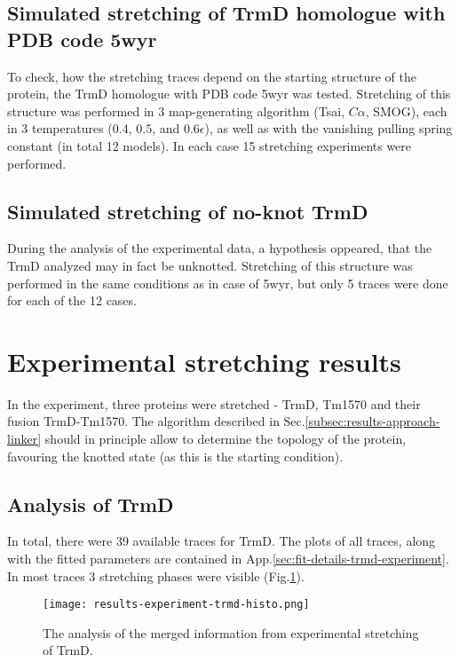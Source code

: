 \subsection{Simulated stretching of TrmD homologue with PDB code 5wyr}
\label{subsec:results-theory-5wyr}
To check, how the stretching traces depend on the starting structure of the protein, the TrmD homologue with PDB code 5wyr was tested.
Stretching of this structure was performed in 3 map-generating algorithm (Tsai, $C\alpha$, SMOG), each in 3 temperatures ($0.4$, $0.5$, and $0.6\epsilon$), as well as with the vanishing pulling spring constant (in total 12 models).
In each case 15 stretching experiments were performed.

\subsection{Simulated stretching of no-knot TrmD}
\label{subsec:results-theory-no-knot}
During the analysis of the experimental data, a hypothesis oppeared, that the TrmD analyzed may in fact be unknotted.
Stretching of this structure was performed in the same conditions as in case of 5wyr, but only 5 traces were done for each of the 12 cases.

\section{Experimental stretching results}
\label{sec:results-experiment}
In the experiment, three proteins were stretched - TrmD, Tm1570 and their fusion TrmD-Tm1570.
The algorithm described in Sec.\ref{subsec:results-approach-linker} should in principle allow to determine the topology of the protein, favouring the knotted state (as this is the starting condition).

\subsection{Analysis of TrmD}
\label{subsec:results-experiment-trmd}
In total, there were 39 available traces for TrmD\@.
The plots of all traces, along with the fitted parameters are contained in App.\ref{sec:fit-details-trmd-experiment}.
In most traces 3 stretching phases were visible (Fig.\ref{fig:results-experiment-trmd-histo}).

\begin{figure}
    \centering
    \texttt{[image: results-experiment-trmd-histo.png]}
    \caption{The analysis of the merged information from experimental stretching of TrmD.}
    \label{fig:results-experiment-trmd-histo}
\end{figure}

